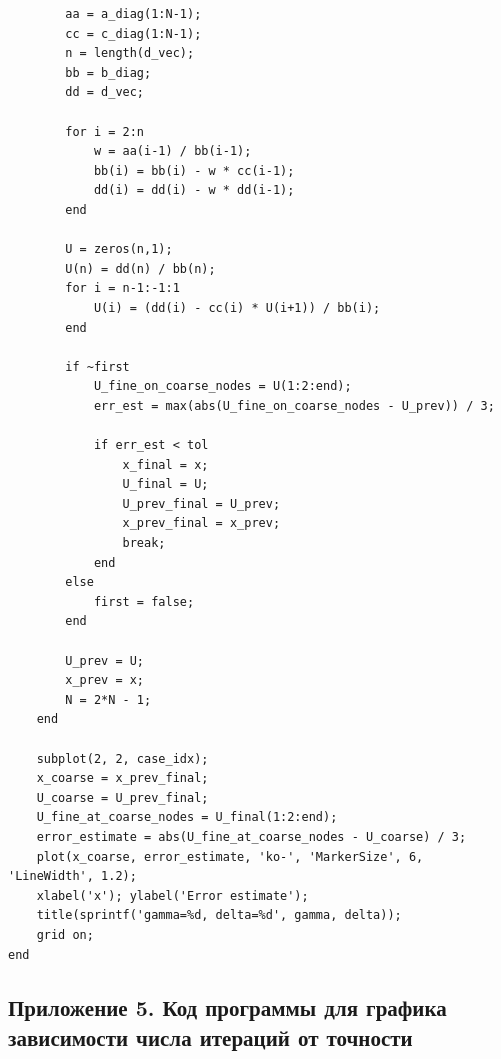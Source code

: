 \documentclass[14pt,a4paper]{extarticle}  %
\numberwithin{equation}{section}
\begin{document}
\begin{verbatim}
        aa = a_diag(1:N-1);
        cc = c_diag(1:N-1);
        n = length(d_vec);
        bb = b_diag;
        dd = d_vec;

        for i = 2:n
            w = aa(i-1) / bb(i-1);
            bb(i) = bb(i) - w * cc(i-1);
            dd(i) = dd(i) - w * dd(i-1);
        end

        U = zeros(n,1);
        U(n) = dd(n) / bb(n);
        for i = n-1:-1:1
            U(i) = (dd(i) - cc(i) * U(i+1)) / bb(i);
        end

        if ~first
            U_fine_on_coarse_nodes = U(1:2:end);
            err_est = max(abs(U_fine_on_coarse_nodes - U_prev)) / 3;

            if err_est < tol
                x_final = x;
                U_final = U;
                U_prev_final = U_prev;
                x_prev_final = x_prev;
                break;
            end
        else
            first = false;
        end

        U_prev = U;
        x_prev = x;
        N = 2*N - 1;
    end

    subplot(2, 2, case_idx);
    x_coarse = x_prev_final;
    U_coarse = U_prev_final;
    U_fine_at_coarse_nodes = U_final(1:2:end);
    error_estimate = abs(U_fine_at_coarse_nodes - U_coarse) / 3;
    plot(x_coarse, error_estimate, 'ko-', 'MarkerSize', 6, 'LineWidth', 1.2);
    xlabel('x'); ylabel('Error estimate');
    title(sprintf('gamma=%d, delta=%d', gamma, delta));
    grid on;
end
\end{verbatim}

\subsection*{Приложение 5. Код программы для графика зависимости числа итераций от точности}
\label{app:convergence_comparison}
\end{document}
